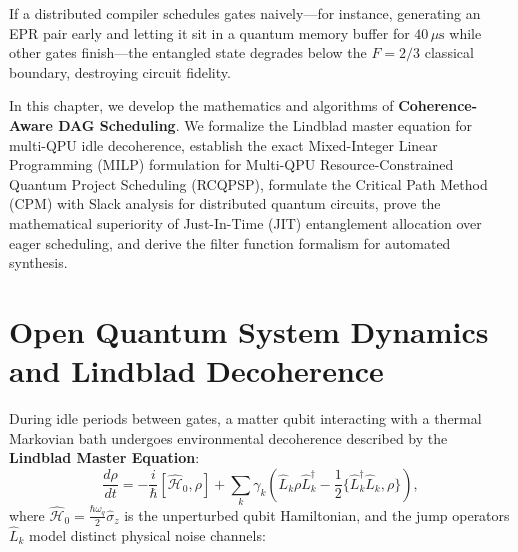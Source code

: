 If a distributed compiler schedules gates naively---for instance, generating an EPR pair early and letting it sit in a quantum memory buffer for $40\,\mu\text{s}$ while other gates finish---the entangled state degrades below the $F = 2/3$ classical boundary, destroying circuit fidelity.

In this chapter, we develop the mathematics and algorithms of \textbf{Coherence-Aware DAG Scheduling}. We formalize the Lindblad master equation for multi-QPU idle decoherence, establish the exact Mixed-Integer Linear Programming (MILP) formulation for Multi-QPU Resource-Constrained Quantum Project Scheduling (RCQPSP), formulate the Critical Path Method (CPM) with Slack analysis for distributed quantum circuits, prove the mathematical superiority of Just-In-Time (JIT) entanglement allocation over eager scheduling, and derive the filter function formalism for automated  synthesis.

\section{Open Quantum System Dynamics and Lindblad Decoherence}
\label{sec:lindblad_decoherence}

During idle periods between gates, a matter qubit interacting with a thermal Markovian bath undergoes environmental decoherence described by the \textbf{Lindblad Master Equation}:
\begin{equation}
    \frac{d\rho}{dt} = -\frac{i}{\hbar}[\hat{\mathcal{H}}_0, \rho] + \sum_{k} \gamma_k \left( \hat{L}_k \rho \hat{L}_k^\dagger - \frac{1}{2} \{ \hat{L}_k^\dagger \hat{L}_k, \rho \} \right),
    \label{eq:lindblad_master_ch09}
\end{equation}
where $\hat{\mathcal{H}}_0 = \frac{\hbar \omega_q}{2} \hat{\sigma}_z$ is the unperturbed qubit Hamiltonian, and the jump operators $\hat{L}_k$ model distinct physical noise channels:

